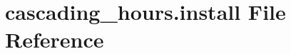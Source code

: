 \hypertarget{cascading__hours_8install}{}\section{cascading\+\_\+hours.\+install File Reference}
\label{cascading__hours_8install}
